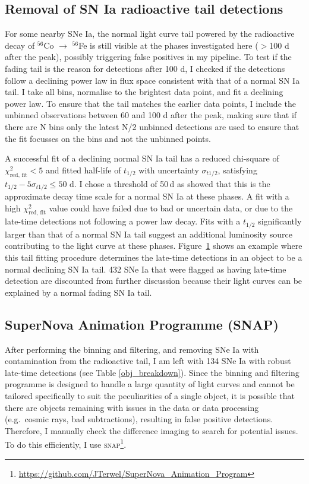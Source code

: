\documentclass[a4paper,oneside,12pt, class=Latex/Classes/PhDthesisPSnPDF, crop=false]{standalone}
\begin{document}
\begin{figure}
 \label{bin_showcase}
\end{figure}

\subsection{Removal of SN Ia radioactive tail detections}
\label{tail_removal}
For some nearby SNe Ia, the normal light curve tail powered by the radioactive decay of $^{56}$Co $\rightarrow$ $^{56}$Fe is still visible at the phases investigated here ($>$100 d after the peak), possibly triggering false positives in my pipeline. To test if the fading tail is the reason for detections after 100 d, I checked if the detections follow a declining power law in flux space consistent with that of a normal SN Ia tail. I take all bins, normalise to the brightest data point, and fit a declining power law. To ensure that the tail matches the earlier data points, I include the unbinned observations between 60 and 100 d after the peak, making sure that if there are N bins only the latest N/2 unbinned detections are used to ensure that the fit focusses on the bins and not the unbinned points.

A successful fit of a declining normal SN Ia tail has a reduced chi-square of $\chi^2_\text{red, fit} < 5$ and fitted half-life of $t_{1/2}$ with uncertainty $\sigma_{t1/2}$, satisfying $t_{1/2} - 5\sigma_{t1/2} \leq 50$ d. I chose a threshold of 50\,d as \citealt{Georgios_11fe} showed that this is the approximate decay time scale for a normal SN Ia at these phases. A fit with a high $\chi^2_\text{red, fit}$ value could have failed due to bad or uncertain data, or due to the late-time detections not following a power law decay. Fits with a $t_{1/2}$ significantly larger than that of a normal SN Ia tail suggest an additional luminosity source contributing to the light curve at these phases. Figure~\ref{bin_showcase} shows an example where this tail fitting procedure determines the late-time detections in an object to be a normal declining SN Ia tail. 432 SNe Ia that were flagged as having late-time detection are discounted from further discussion because their light curves can be explained by a normal fading SN Ia tail. 


\subsection{SuperNova Animation Programme (SNAP)}
\label{snap}
 After performing the binning and filtering, and removing SNe Ia with contamination from the radioactive tail, I am left with 134 SNe Ia with robust late-time detections (see Table \ref{obj_breakdown}). Since the binning and filtering programme is designed to handle a large quantity of light curves and cannot be tailored specifically to suit the peculiarities of a single object, it is possible that there are objects remaining with issues in the data or data processing (e.g.~cosmic rays, bad subtractions), resulting in false positive detections. Therefore, I manually check the difference imaging to search for potential issues. To do this efficiently, I use \textsc{snap}\footnote{\url{https://github.com/JTerwel/SuperNova_Animation_Program}}.
\end{document}
